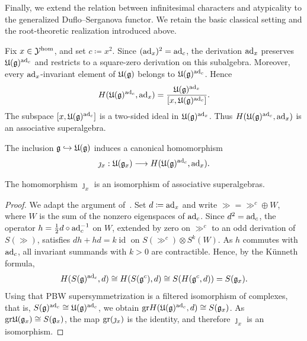 Finally, we extend the relation between infinitesimal characters and atypicality to the generalized Duflo--Serganova functor. We retain the basic classical setting and the root-theoretic realization introduced above.

Fix $x\in{\mathcal Y}^{\hom}$, and set $c\coloneqq x^2$. Since $(\operatorname{ad}_x)^2=\operatorname{ad}_c$, the derivation $\operatorname{ad}_x$ preserves ${\mathfrak U}({\mathfrak{g}})^{\operatorname{ad}_c}$ and restricts to a square-zero derivation on this subalgebra. Moreover, every $\operatorname{ad}_x$-invariant element of ${\mathfrak U}({\mathfrak{g}})$ belongs to ${\mathfrak U}({\mathfrak{g}})^{\operatorname{ad}_c}$. Hence
\begin{equation}\label{eq::generalized_DS_enveloping_cohomology}
H({\mathfrak U}({\mathfrak{g}})^{\operatorname{ad}_c},\operatorname{ad}_x)
=
\frac{{\mathfrak U}({\mathfrak{g}})^{\operatorname{ad}_x}}{[x,{\mathfrak U}({\mathfrak{g}})^{\operatorname{ad}_c}]}.
\end{equation}
The subspace $[x,{\mathfrak U}({\mathfrak{g}})^{\operatorname{ad}_c}]$ is a two-sided ideal in ${\mathfrak U}({\mathfrak{g}})^{\operatorname{ad}_x}$. Thus $H({\mathfrak U}({\mathfrak{g}})^{\operatorname{ad}_c},\operatorname{ad}_x)$ is an associative superalgebra.

The inclusion ${\mathfrak{g}}\hookrightarrow{\mathfrak U}({\mathfrak{g}})$ induces a canonical homomorphism
\begin{equation}\label{eq::generalized_DS_PBW}
\jmath_x:
{\mathfrak U}({\mathfrak{g}}_x)\longrightarrow H({\mathfrak U}({\mathfrak{g}})^{\operatorname{ad}_c},\operatorname{ad}_x).
\end{equation}

\begin{lemma}\label{lemm::j_math_is_iso}
The homomorphism $\jmath_x$ is an isomorphism of associative superalgebras.
\end{lemma}


\begin{proof}
We adapt the argument of~\cite[Lemma~6.6]{duflo2005associated}. Set $d\coloneqq\operatorname{ad}_x$ and write $\gg=\gg^c\oplus W$, where $W$ is the sum of the nonzero eigenspaces of $\operatorname{ad}_c$. Since $d^2=\operatorname{ad}_c$, the operator $h=\frac12d\circ\operatorname{ad}_c^{-1}$ on $W$, extended by zero on $\gg^c$ to an odd derivation of $S(\gg)$, satisfies $dh+hd=k\operatorname{id}$ on $S(\gg^c)\otimes S^k(W)$. As $h$ commutes with $\operatorname{ad}_c$, all invariant summands with $k>0$ are contractible. Hence, by the Künneth formula,
\begin{equation*}
H(S({\mathfrak{g}})^{\operatorname{ad}_c},d)\cong H(S({\mathfrak{g}}^c),d)\cong S(H({\mathfrak{g}}^c,d))=S({\mathfrak{g}}_x).
\end{equation*}
Using that PBW supersymmetrization is a filtered isomorphism of complexes, that is, $S({\mathfrak{g}})^{\operatorname{ad}_c}\cong{\mathfrak U}({\mathfrak{g}})^{\operatorname{ad}_c}$, we obtain ${\mathrm{gr}} H({\mathfrak U}({\mathfrak{g}})^{\operatorname{ad}_c},d)\cong S({\mathfrak{g}}_x)$. As ${\mathrm{gr}}{\mathfrak U}({\mathfrak{g}}_x)\cong S({\mathfrak{g}}_x)$, the map ${\mathrm{gr}}(\jmath_x)$ is the identity, and therefore $\jmath_x$ is an isomorphism.
\end{proof}

